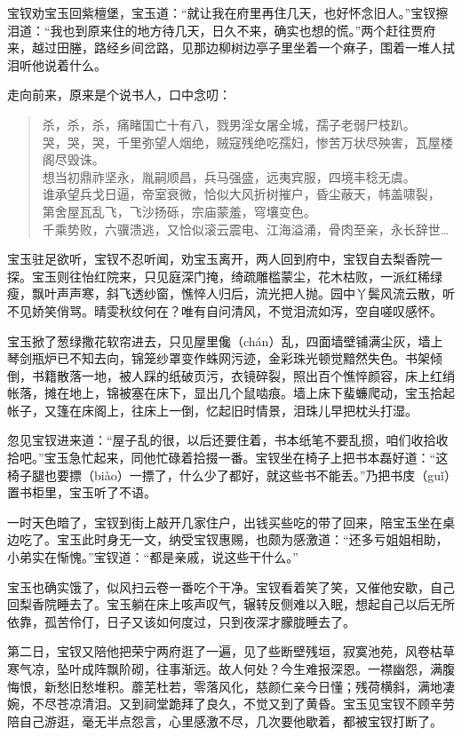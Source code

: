 \documentclass[12pt,oneside]{book}
\newenvironment{shici}{%
\begin{verse}%
\centering\large\hspace{12pt}}%
{\end{verse}}
\begin{document}
宝钗劝宝玉回紫檀堡，宝玉道：“就让我在府里再住几天，也好怀念旧人。”宝钗擦泪道：“我也到原来住的地方待几天，日久不来，确实也想的慌。”两个赶往贾府来，越过田塍，路经乡间岔路，见那边柳树边亭子里坐着一个痳子，围着一堆人拭泪听他说着什么。

走向前来，原来是个说书人，口中念叨：

\begin{shici}
杀，杀，杀，痛睹国亡十有八，戮男淫女屠全城，孺子老弱尸枝趴。\\
哭，哭，哭，千里弥望人烟绝，贼寇残绝吃孺妇，惨苦万状尽殃害，瓦屋楼阁尽毁诛。\\
想当初鼎祚坚永，胤嗣顺昌，兵马强盛，远夷宾服，四境丰稔无虞。\\
谁承望兵戈日逼，帝室衰微，恰似大风折树摧户，昏尘蔽天，帏盖啸裂，\\
第舍屋瓦乱飞，飞沙扬砾，宗庙蒙羞，穹壤变色。\\
千乘势败，六骥溃逃，又恰似滚云震电、江海溢涌，骨肉至亲，永长辞世…
\end{shici}


宝玉驻足欲听，宝钗不忍听闻，劝宝玉离开，两人回到府中，宝钗自去梨香院一探。宝玉则往怡红院来，只见庭深门掩，绮疏雕槛蒙尘，花木枯败，一派红稀绿瘦，飘叶声声寒，斜飞透纱窗，憔悴人归后，流光把人抛。园中丫鬓风流云散，听不见娇笑俏骂。晴雯秋纹何在？唯有自问清风，不觉泪流如泻，空自嗟叹感怀。

宝玉掀了葱绿撒花软帘进去，只见屋里儳（chán）乱，四面墙壁铺满尘灰，墙上琴剑瓶炉已不知去向，锦笼纱罩变作蛛网污迹，金彩珠光顿觉黯然失色。书架倾倒，书籍散落一地，被人踩的纸破页污，衣镜碎裂，照出百个憔悴颜容，床上红绡帐落，摊在地上，锦被塞在床下，显出几个鼠啮痕。墙上床下蜚蠊爬动，宝玉拾起帐子，又篷在床阁上，往床上一倒，忆起旧时情景，泪珠儿早把枕头打湿。

忽见宝钗进来道：“屋子乱的很，以后还要住着，书本纸笔不要乱掼，咱们收拾收拾吧。”宝玉急忙起来，同他忙碌着拾掇一番。宝钗坐在椅子上把书本磊好道：“这椅子腿也要摽（biào）一摽了，什么少了都好，就这些书不能丢。”乃把书庋（guǐ）置书柜里，宝玉听了不语。

一时天色暗了，宝钗到街上敲开几家住户，出钱买些吃的带了回来，陪宝玉坐在桌边吃了。宝玉此时身无一文，纳受宝钗惠赐，也颇为感激道：“还多亏姐姐相助，小弟实在惭愧。”宝钗道：“都是亲戚，说这些干什么。”

宝玉也确实饿了，似风扫云卷一番吃个干净。宝钗看着笑了笑，又催他安歇，自己回梨香院睡去了。宝玉躺在床上咳声叹气，辗转反侧难以入眠，想起自己以后无所依靠，孤苦伶仃，日子又该如何度过，只到夜深才朦胧睡去了。

第二日，宝钗又陪他把荣宁两府逛了一遍，见了些断壁残垣，寂寞池苑，风卷枯草寒气凉，坠叶成阵飘阶砌，往事渐远。故人何处？今生难报深恩。一襟幽怨，满腹悔恨，新愁旧愁堆积。蘼芜杜若，零落风化，慈颜仁亲今日懂；残荷横斜，满地凄婉，不尽苍凉清泪。又到祠堂跪拜了良久，不觉又到了黄昏。宝玉见宝钗不顾辛劳陪自己游逛，毫无半点怨言，心里感激不尽，几次要他歇着，都被宝钗打断了。
\end{document}
